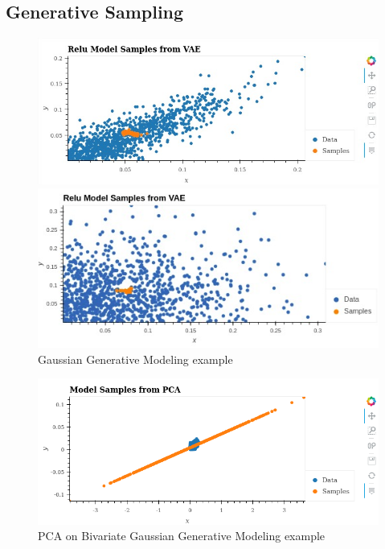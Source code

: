 \documentclass[12pt]{article}
\begin{document}
\subsection{Generative Sampling}
\hspace{0.5em}
\begin{figure}[!htb]
     \centering
         \includegraphics[scale=0.4]{../../media/generate.jpeg}
       
         \label{fig:gen1}
     
     
         \centering
         \includegraphics[scale=0.5]{../../media/generate3.jpeg}

         \label{fig:gen3}
        \caption{Gaussian Generative Modeling example}
        \label{fig:generative}
\end{figure}

\newpage

\begin{figure}[!hb]
\includegraphics[scale = 0.3]{../../media/04-generative-pca.png}
    \caption{PCA on Bivariate Gaussian Generative Modeling example}
    \label{fig:generative-pca}
\end{figure}
\end{document}
